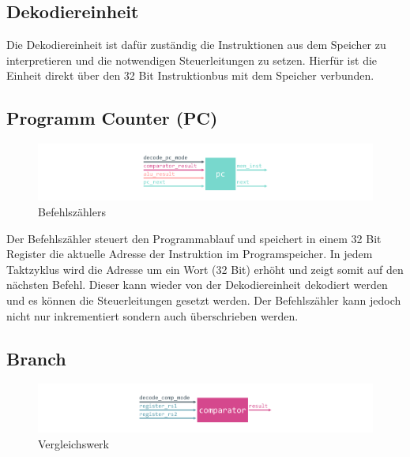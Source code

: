        \subsection{Dekodiereinheit}
            
            Die Dekodiereinheit ist dafür zuständig die Instruktionen aus dem Speicher zu interpretieren und die notwendigen
            Steuerleitungen zu setzen.
            Hierfür ist die Einheit direkt über den 32 Bit Instruktionbus mit dem Speicher verbunden.

        \subsection{Programm Counter (PC)}\label{lab:pc}

            \begin{figure}[H]
                \centering
                \includegraphics[scale=1]{img/block_pc.pdf}
                \caption{Befehlszählers}
                \label{fig:pc}
            \end{figure}

            Der Befehlszähler steuert den Programmablauf und speichert in einem 32 Bit Register
            die aktuelle Adresse der Instruktion im Programspeicher.
            In jedem Taktzyklus wird die Adresse um ein Wort (32 Bit) erhöht und zeigt somit
            auf den nächsten Befehl. Dieser kann wieder von der Dekodiereinheit dekodiert werden
            und es können die Steuerleitungen gesetzt werden. Der Befehlszähler kann jedoch nicht nur
            inkrementiert sondern auch überschrieben werden.
            \newpage
            

        \subsection{Branch}

            \begin{figure}[H]
                \centering
                \includegraphics[scale=1]{img/block_comparator.pdf}
                \caption{Vergleichswerk}
                \label{fig:alu}
            \end{figure}

